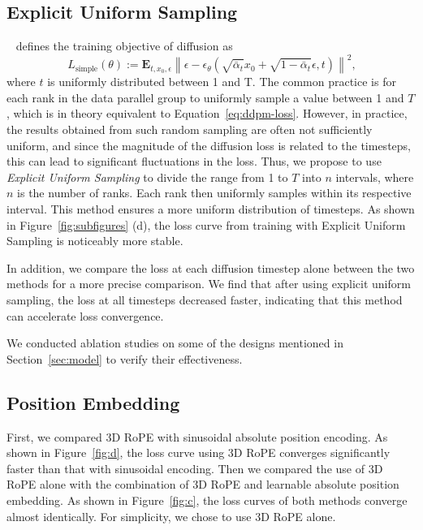 \documentclass{article} \usepackage{iclr2024_conference,times}
\begin{document}
\subsection{Explicit Uniform Sampling}

~\cite{ho2020denoising} defines the training objective of diffusion as 
\begin{equation}~\label{eq:ddpm-loss}
    L_\mathrm{simple}(\theta) := \mathbf{E}_{t, x_0, \epsilon}{ \left\| \epsilon - \epsilon_\theta(\sqrt{\bar\alpha_t} x_0 + \sqrt{1-\bar\alpha_t}\epsilon, t) \right\|^2},
\end{equation}
where $t$ is uniformly distributed between 1 and T. 
The common practice is for each rank in the data parallel group to uniformly sample a value between 1 and $T$, which is in theory equivalent to Equation~\ref{eq:ddpm-loss}. 
However, in practice, the results obtained from such random sampling are often not sufficiently uniform, and since the magnitude of the diffusion loss is related to the timesteps, this can lead to significant fluctuations in the loss. 
Thus, we propose to use \textit{Explicit Uniform Sampling} to divide the range from 1 to $T$ into $n$ intervals, where $n$ is the number of ranks. 
Each rank then uniformly samples within its respective interval. 
This method ensures a more uniform distribution of timesteps. 
As shown in Figure~\ref{fig:subfigures} (d), the loss curve from training with Explicit Uniform Sampling is noticeably more stable. 

In addition, we compare the loss at each diffusion timestep alone between the two methods for a more precise comparison. We find that after using explicit uniform sampling, the loss at all timesteps decreased faster, indicating that this method can accelerate loss convergence. 

We conducted ablation studies on some of the designs mentioned in Section~\ref{sec:model} to verify their effectiveness.


\subsection{Position Embedding}
First, we compared 3D RoPE with sinusoidal absolute position encoding. As shown in Figure~\ref{fig:d}, the loss curve using 3D RoPE converges significantly faster than that with sinusoidal encoding.
Then we compared the use of 3D RoPE alone with the combination of 3D RoPE and learnable absolute position embedding. As shown in Figure~\ref{fig:c}, the loss curves of both methods converge almost identically. For simplicity, we chose to use 3D RoPE alone.
\end{document}
